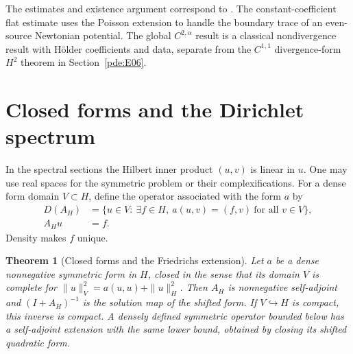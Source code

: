 \documentclass[11pt,oneside,openany]{book}
\theoremstyle{plain}
\newtheorem{theorem}{Theorem}[chapter]
\theoremstyle{definition}
\theoremstyle{remark}
\begin{document}
The estimates and existence argument correspond to
\cite[Theorems 6.2, 6.6, and 6.13--6.14]{GT}.
The constant-coefficient flat estimate uses the Poisson
extension to handle the boundary trace of an even-source
Newtonian potential. The global \(C^{2,\alpha}\) result is a
classical nondivergence result with Hölder coefficients
and data, separate from the \(C^{1,1}\) divergence-form
\(H^2\) theorem in Section~\ref{pde:E06}.

\section{Closed forms and the Dirichlet spectrum}\label{pde:E10}

In the spectral sections the Hilbert inner product \((u,v)\) is
linear in \(u\). One may use real spaces for the symmetric problem
or their complexifications. For a dense form domain \(V\subset H\),
define the operator associated with the form \(a\) by
\[
 \begin{split}
 D(A_H)&=\{u\in V:\ \exists f\in H,\ 
                    a(u,v)=(f,v)\ \text{for all }v\in V\},\\
 A_Hu&=f.
 \end{split}
\]
Density makes \(f\) unique.

\begin{theorem}[Closed forms and the Friedrichs extension]
\label{pde:elliptic-friedrichs}
Let \(a\) be a dense nonnegative symmetric form in \(H\),
closed in the sense that its domain \(V\) is complete for
\(\|u\|_V^2=a(u,u)+\|u\|_H^2\).
Then \(A_H\) is nonnegative self-adjoint and
\((I+A_H)^{-1}\) is the solution map of the shifted form.
If \(V\hookrightarrow H\) is compact, this inverse is compact.
A densely defined symmetric operator bounded below has a
self-adjoint extension with the same lower bound, obtained
by closing its shifted quadratic form.
\end{theorem}
\end{document}
